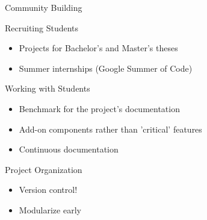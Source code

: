 

\begin{frame}[fragile]{Community Building}

 \begin{block}{Recruiting Students}
  \begin{itemize}
   \item Projects for Bachelor's and Master's theses
   \item Summer internships (Google Summer of Code)
  \end{itemize}
 \end{block}

 \begin{block}{Working with Students}
  \begin{itemize}
   \item Benchmark for the project's documentation
   \item Add-on components rather than 'critical' features
   \item Continuous documentation
  \end{itemize}
 \end{block}

 
 \begin{block}{Project Organization}
  \begin{itemize}
   \item Version control!
   \item Modularize early
  \end{itemize}
 \end{block}
 

\end{frame}




